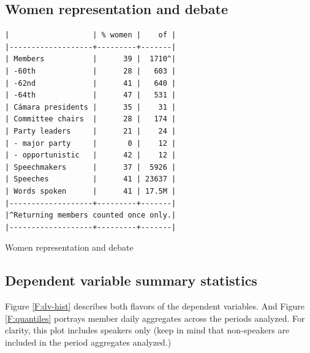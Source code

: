 \documentclass[letter,12pt]{article}
\begin{document}


\subsection{Women representation and debate}

\begin{table}
  \begin{scriptsize}
    \begin{verbatim}
|                   | % women |    of |
|-------------------+---------+-------|
| Members           |      39 |  1710^|
| -60th             |      28 |   603 |
| -62nd             |      41 |   640 |
| -64th             |      47 |   531 |
| Cámara presidents |      35 |    31 |
| Committee chairs  |      28 |   174 |
| Party leaders     |      21 |    24 |
| - major party     |       0 |    12 |
| - opportunistic   |      42 |    12 |
| Speechmakers      |      37 |  5926 |
| Speeches          |      41 | 23637 |
| Words spoken      |      41 | 17.5M |
|-------------------+---------+-------|
|^Returning members counted once only.|
|-------------------+---------+-------|
    \end{verbatim}
  \end{scriptsize}
\caption{Women representation and debate}\label{T:women}
\end{table}



\subsection{Dependent variable summary statistics}

Figure \ref{F:dv-hist} describes both flavors of the dependent variables. And Figure \ref{F:quantiles} portrays member daily aggregates across the periods analyzed. For clarity, this plot includes speakers only (keep in mind that non-speakers are included in the period aggregates analyzed.)
\end{document}
